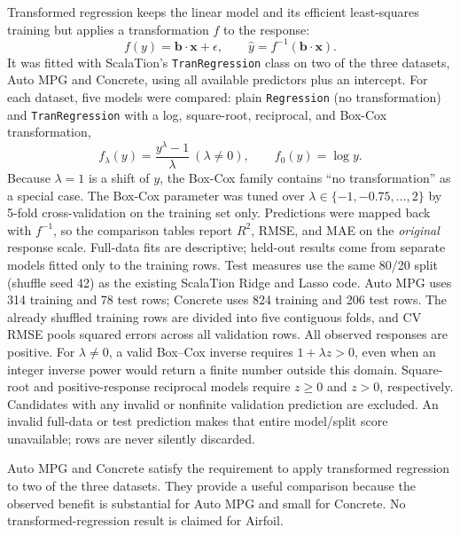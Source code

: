 
Transformed regression keeps the linear model and its efficient least-squares training but applies a transformation $f$ to the response:
\[
f(y) = \mathbf{b}\cdot\mathbf{x} + \epsilon, \qquad \hat{y} = f^{-1}(\mathbf{b}\cdot\mathbf{x}).
\]
It was fitted with ScalaTion's \texttt{TranRegression} class on two of the three datasets, Auto MPG and Concrete, using all available predictors plus an intercept. For each dataset, five models were compared: plain \texttt{Regression} (no transformation) and \texttt{TranRegression} with a log, square-root, reciprocal, and Box-Cox transformation,
\[
f_\lambda(y) = \frac{y^{\lambda}-1}{\lambda}\ (\lambda \neq 0), \qquad f_0(y) = \log y .
\]
Because $\lambda = 1$ is a shift of $y$, the Box-Cox family contains ``no transformation'' as a special case. The Box-Cox parameter was tuned over $\lambda \in \{-1, -0.75, \dots, 2\}$ by 5-fold cross-validation on the training set only. Predictions were mapped back with $f^{-1}$, so the comparison tables report $R^2$, RMSE, and MAE on the \emph{original} response scale. Full-data fits are descriptive; held-out results come from separate models fitted only to the training rows. Test measures use the same 80/20 split (shuffle seed 42) as the existing ScalaTion Ridge and Lasso code. Auto MPG uses 314 training and 78 test rows; Concrete uses 824 training and 206 test rows. The already shuffled training rows are divided into five contiguous folds, and CV RMSE pools squared errors across all validation rows. All observed responses are positive. For $\lambda\ne0$, a valid Box--Cox inverse requires $1+\lambda z>0$, even when an integer inverse power would return a finite number outside this domain. Square-root and positive-response reciprocal models require $z\geq0$ and $z>0$, respectively. Candidates with any invalid or nonfinite validation prediction are excluded. An invalid full-data or test prediction makes that entire model/split score unavailable; rows are never silently discarded.

Auto MPG and Concrete satisfy the requirement to apply transformed regression to two of the three datasets. They provide a useful comparison because the observed benefit is substantial for Auto MPG and small for Concrete. No transformed-regression result is claimed for Airfoil.

